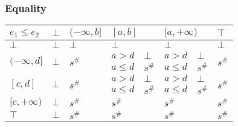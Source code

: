 \documentclass{beamer}
\begin{document}
    
        \begin{frame}
            \frametitle{Equality}
    \begin{table}[]
        \begin{tabular}{|l|l|l|ll|ll|l|}
        \hline
        $e_1 \le e_2$                   & $\bot$                  & $(-\infty, b]$          & \multicolumn{2}{l|}{$[a, b]$} & \multicolumn{2}{l|}{$[a, +\infty)$} & $\top$                  \\ \hline
        $\bot$                          & $\bot$                  & $\bot$                  & \multicolumn{2}{l|}{$\bot$}   & \multicolumn{2}{l|}{$\bot$}         & $\bot$                  \\ \hline
        \multirow{2}{*}{$(-\infty, d]$} & \multirow{2}{*}{$\bot$} & \multirow{2}{*}{$s^\#$} & $a > d$         & $\bot$      & $a > d$            & $\bot$         & \multirow{2}{*}{$s^\#$} \\
                                        &                         &                         & $a \le d$       & $s^\#$      & $a \le d$          & $s^\#$         &                         \\ \hline
        \multirow{2}{*}{$[c, d]$}       & \multirow{2}{*}{$\bot$} & \multirow{2}{*}{$s^\#$} & $a > d$         & $\bot$      & $a > d$            & $\bot$         & \multirow{2}{*}{$s^\#$} \\
                                        &                         &                         & $a \le d$       & $s^\#$      & $a \le d$          & $s^\#$         &                         \\ \hline
        $[c, +\infty)$                  & $\bot$                  & $s^\#$                  & \multicolumn{2}{l|}{$s^\#$}   & \multicolumn{2}{l|}{$s^\#$}         & $s^\#$                  \\ \hline
        $\top$                          & $\bot$                  & $s^\#$                  & \multicolumn{2}{l|}{$s^\#$}   & \multicolumn{2}{l|}{$s^\#$}         & $s^\#$                  \\ \hline
        \end{tabular}
        \end{table}
    \end{frame}
    
\end{document}
